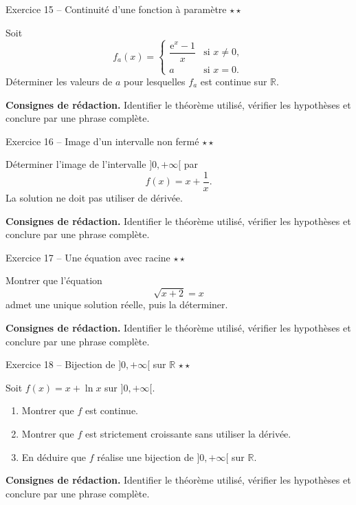 \documentclass[11pt,a4paper]{article}
\newcommand{\etoiles}[1]{\hfill\textcolor{orangeprepa}{\textbf{#1}}}
\newcommand{\R}{\mathbb{R}}
\newcommand{\e}{\mathrm{e}}
\begin{document}
\begin{exobox}{Exercice 15 -- Continuité d'une fonction à paramètre \etoiles{$\star\star$}}

Soit
\[
f_a(x)=\begin{cases}
\dfrac{\e^x-1}{x} & \text{si }x\neq0,\\
a & \text{si }x=0.
\end{cases}
\]
Déterminer les valeurs de $a$ pour lesquelles $f_a$ est continue sur $\R$.

\medskip
\textbf{Consignes de rédaction.} Identifier le théorème utilisé, vérifier les hypothèses et conclure par une phrase complète.
\end{exobox}


\begin{exobox}{Exercice 16 -- Image d'un intervalle non fermé \etoiles{$\star\star$}}

Déterminer l'image de l'intervalle $]0,+\infty[$ par
\[
f(x)=x+\frac1x.
\]
La solution ne doit pas utiliser de dérivée.

\medskip
\textbf{Consignes de rédaction.} Identifier le théorème utilisé, vérifier les hypothèses et conclure par une phrase complète.
\end{exobox}


\begin{exobox}{Exercice 17 -- Une équation avec racine \etoiles{$\star\star$}}

Montrer que l'équation
\[
\sqrt{x+2}=x
\]
admet une unique solution réelle, puis la déterminer.

\medskip
\textbf{Consignes de rédaction.} Identifier le théorème utilisé, vérifier les hypothèses et conclure par une phrase complète.
\end{exobox}


\begin{exobox}{Exercice 18 -- Bijection de $]0,+\infty[$ sur $\R$ \etoiles{$\star\star$}}

Soit $f(x)=x+\ln x$ sur $]0,+\infty[$.
\begin{enumerate}
\item Montrer que $f$ est continue.
\item Montrer que $f$ est strictement croissante sans utiliser la dérivée.
\item En déduire que $f$ réalise une bijection de $]0,+\infty[$ sur $\R$.
\end{enumerate}

\medskip
\textbf{Consignes de rédaction.} Identifier le théorème utilisé, vérifier les hypothèses et conclure par une phrase complète.
\end{exobox}
\end{document}
